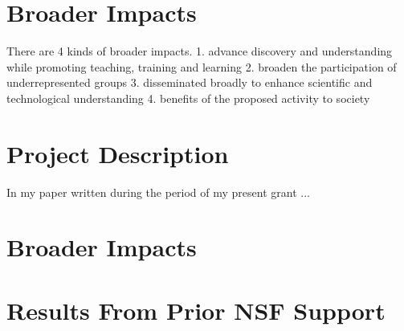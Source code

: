 \documentclass{proposalnsf}
\begin{document}
\section{Broader Impacts}
There are 4 kinds of broader impacts.
1. advance discovery and understanding while promoting teaching,
training and learning
2. broaden the participation of underrepresented groups
3. disseminated broadly to enhance scientific and technological
understanding
4. benefits of the proposed activity to society




\section{Project Description}


In my paper \cite{paper01} written during the period of my present
grant ... 


\section{Broader Impacts}

\section{Results From Prior NSF Support}
\end{document}
